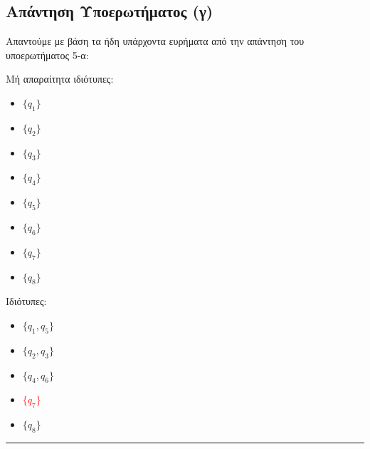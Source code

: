 \subsection{Απάντηση Υποερωτήματος (γ)}
\label{ssec:Solution_2.3}
\doublespacing
Απαντούμε με βάση τα ήδη υπάρχοντα ευρήματα από την απάντηση του υποερωτήματος 5-α:

\begin{tcolorbox}[colback=yellow!15!white, colframe=blue!50!white,
	fonttitle=\bfseries\Large, title = Περιγραφή κλάσεων ισοδυναμίας $\sim M$]

	\centering

	Μή απαραίτητα ιδιότυπες:
\reducevspace\reducevspace\reducevspace\reducevspace\reducevspace\reducevspace\reducevspace\reducevspace
	\begin{multicols}{4}
		\begin{itemize}
			\itemsep0em
			\item $\{q_{1}\}$
			\item $\{q_{2}\}$
			\item $\{q_{3}\}$
			\item $\{q_{4}\}$%
			\item $\{q_{5}\}$
			\item $\{q_{6}\}$
			\item $\{q_{7}\}$
			\item $\{q_{8}\}$ %
		\end{itemize}
	\end{multicols}

	Ιδιότυπες:
\reducevspace\reducevspace\reducevspace\reducevspace\reducevspace\reducevspace\reducevspace\reducevspace
	\begin{multicols}{3}
		\begin{itemize}
			\itemsep0em
			\item \textcolor[RGB]{0,100,0}{$\{q_{1}, q_{5}\}$}
			\item $\{q_{2}, q_{3}\}$
			\item $\{q_{4}, q_{6}\}$
			\item \textcolor{red}{$\{q_{7}\}$}
			\item $\{q_{8}\}$
		\end{itemize}
	\end{multicols}


\end{tcolorbox}
\reducevspace\reducevspace\reducevspace\reducevspace\reducevspace\reducevspace
\reducevspace\reducevspace\reducevspace\reducevspace\reducevspace\reducevspace
\begin{center}
	\noindent\rule{\linewidth}{0.5pt}
\end{center}
\reducevspace\reducevspace\reducevspace\reducevspace\reducevspace\reducevspace
\reducevspace\reducevspace\reducevspace\reducevspace\reducevspace\reducevspace
\reducevspace\reducevspace\reducevspace\reducevspace\reducevspace\reducevspace
